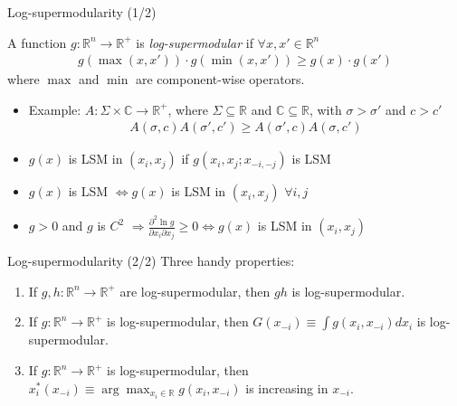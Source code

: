 \documentclass[11pt,notes=hide,aspectratio=169]{beamer}
\begin{document}
\begin{frame}{Log-supermodularity (1/2)}
\begin{definition}
A function $g:\mathbb{R}^n\to\mathbb{R}^{+}$ is \emph{log-supermodular} if $\forall x,x'\in\mathbb{R}^n$
\begin{align*}
g\left(\max\left(x,x'\right)\right)\cdot g\left(\min\left(x,x'\right)\right)\geq g(x)\cdot g(x')
\end{align*}
where $\max$ and $\min$ are component-wise operators.
\end{definition}
\begin{itemize}
	\item Example: $A: \Sigma\times\mathbb{C}\to\mathbb{R}^{+}$, where $\Sigma\subseteq\mathbb{R}$ and $\mathbb{C}\subseteq\mathbb{R}$, with $\sigma>\sigma'$ and $c>c'$
		\begin{align*}
		A(\sigma,c)A(\sigma',c')\geq A(\sigma',c)A(\sigma,c')
		\end{align*}
	\item $g(x)$ is LSM in $(x_i,x_j)$ if $g(x_i,x_j;x_{-i,-j})$ is LSM 
	\item $g(x)$ is LSM $\iff g(x)$ is LSM in $(x_i,x_j)$  $\forall i,j$
	\item $g>0$ and $g$ is $C^2$ $\Rightarrow \frac{\partial^2 \ln g}{\partial x_i \partial x_j}\geq 0 \iff g(x)$ is LSM in $(x_i,x_j)$
\end{itemize}
\end{frame}
\begin{frame}{Log-supermodularity (2/2)}
Three handy properties:
\begin{enumerate}
\item If $g,h:\mathbb{R}^n\to\mathbb{R}^{+}$ are log-supermodular, then $gh$ is log-supermodular.
\item If $g:\mathbb{R}^n\to\mathbb{R}^{+}$ is log-supermodular, then $G(x_{-i})\equiv \int g(x_i,x_{-i})dx_i$ is log-supermodular.
\item If $g:\mathbb{R}^n\to\mathbb{R}^{+}$ is log-supermodular, then $x_i^* (x_{-i}) \equiv \arg\max_{x_i\in\mathbb{R}} g(x_i,x_{-i})$ is increasing in $x_{-i}$.
\end{enumerate}
\end{frame}
\end{document}
